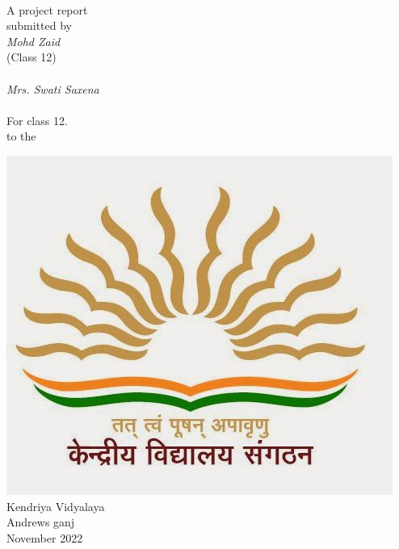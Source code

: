 \documentclass[12pt,a4paper]{report}
\begin{document}
    

\begin{titlepage}
    {\\\vspace*{\fill} {\large{A project report\\[0.2cm] submitted by}}\\\vspace*{\fill} {\Large{\itshape Mohd Zaid}}\\(Class 12)\\ \vspace*{\fill}{\large under the supervision of}\\[0.2cm]
    {\Large \textit{Mrs. Swati Saxena}}\\\vspace*{\fill}{\large in completion of project\\ submitted as yearly project} \\
    {\Large For class 12.}  \\\vspace*{\fill} to the\\\vspace*{\fill}
    
    \includegraphics[scale=0.5]{logo.png}\\[0.5cm]
    {\large Kendriya Vidyalaya \\ Andrews ganj} \\ November 2022

}
\end{titlepage}
\end{document}
